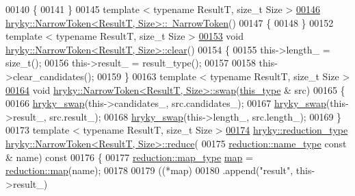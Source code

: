 \begin{DoxyCode}
00140 \{
00141 \}
00145 \textcolor{keyword}{template} < \textcolor{keyword}{typename} ResultT, \textcolor{keywordtype}{size\_t} Size >
\hypertarget{narrow__token_8h_source_l00146}{}\hyperlink{classhryky_1_1_narrow_token_a52b08c0ec3f338bea935f6659b456b09}{00146} \hyperlink{classhryky_1_1_narrow_token}{hryky::NarrowToken<ResultT, Size>::~NarrowToken}()
00147 \{
00148 \}
00152 \textcolor{keyword}{template} < \textcolor{keyword}{typename} ResultT, \textcolor{keywordtype}{size\_t} Size >
\hypertarget{narrow__token_8h_source_l00153}{}\hyperlink{classhryky_1_1_narrow_token_a85f5dc5a4b422c3251139e60cf7fef0d}{00153} \textcolor{keywordtype}{void} \hyperlink{namespacehryky_aa201297ea9530da954a7230be71cc19d}{hryky::NarrowToken<ResultT, Size>::clear}()
00154 \{
00155     this->length\_ = size\_t();
00156     this->result\_ = result\_type();
00157 
00158     this->clear\_candidates();
00159 \}
00163 \textcolor{keyword}{template} < \textcolor{keyword}{typename} ResultT, \textcolor{keywordtype}{size\_t} Size >
\hypertarget{narrow__token_8h_source_l00164}{}\hyperlink{classhryky_1_1_narrow_token_a141661722b4c90ec9699fd9511c612ab}{00164} \textcolor{keywordtype}{void} \hyperlink{namespacehryky_a4282146df5ea2b68cb667896a2205909}{hryky::NarrowToken<ResultT, Size>::swap}(\hyperlink{classhryky_1_1_narrow_token}{this_type} & src)
00165 \{
00166     \hyperlink{namespacehryky_add9c1c1fdfda07cd47bcb7c16d3a823a}{hryky_swap}(this->candidates\_, src.candidates\_);
00167     \hyperlink{namespacehryky_add9c1c1fdfda07cd47bcb7c16d3a823a}{hryky_swap}(this->result\_, src.result\_);
00168     \hyperlink{namespacehryky_add9c1c1fdfda07cd47bcb7c16d3a823a}{hryky_swap}(this->length\_, src.length\_);
00169 \}
00173 \textcolor{keyword}{template} < \textcolor{keyword}{typename} ResultT, \textcolor{keywordtype}{size\_t} Size >
\hypertarget{narrow__token_8h_source_l00174}{}\hyperlink{classhryky_1_1_narrow_token_a26077cf647e46c7482990337560504fa}{00174} \hyperlink{classhryky_1_1_intrusive_ptr}{hryky::reduction_type} \hyperlink{namespacehryky_af41cb3af6766761da0ff21b84527a52c}{hryky::NarrowToken<ResultT, Size>::reduce}(
00175     \hyperlink{classhryky_1_1reduction_1_1_string}{reduction::name_type} \textcolor{keyword}{const} & name)\textcolor{keyword}{ const}
00176 \textcolor{keyword}{}\{
00177     \hyperlink{classhryky_1_1_intrusive_ptr}{reduction::map_type} \hyperlink{namespacehryky_1_1reduction_ac5eae270cf8047b294dc4ff3e5e11a79}{map} = \hyperlink{namespacehryky_1_1reduction_ac5eae270cf8047b294dc4ff3e5e11a79}{reduction::map}(name);
00178 
00179     ((*map)
00180      .append(\textcolor{stringliteral}{"result"}, this->result\_)

\end{DoxyCode}
